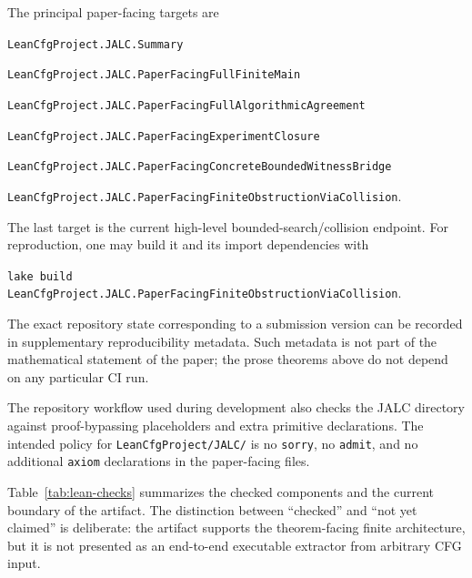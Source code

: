 \documentclass[sub]{jalc}
\begin{document}
The principal paper-facing
targets are
\begin{center}\small
\begin{minipage}{0.92\linewidth}
\texttt{LeanCfgProject.JALC.Summary}\par
\texttt{LeanCfgProject.JALC.PaperFacingFullFiniteMain}\par
\texttt{LeanCfgProject.JALC.PaperFacingFullAlgorithmicAgreement}\par
\texttt{LeanCfgProject.JALC.PaperFacingExperimentClosure}\par
\texttt{LeanCfgProject.JALC.PaperFacingConcreteBoundedWitnessBridge}\par
\texttt{LeanCfgProject.JALC.PaperFacingFiniteObstructionViaCollision}.
\end{minipage}
\end{center}
The last target is the current high-level bounded-search/collision endpoint.
For reproduction, one may build it and its import dependencies with
\begin{center}\small
\texttt{lake build LeanCfgProject.JALC.PaperFacingFiniteObstructionViaCollision}.
\end{center}
The exact repository state corresponding to a submission version can be recorded
in supplementary reproducibility metadata.  Such metadata is not part of the
mathematical statement of the paper; the prose theorems above do not depend on
any particular CI run.

The repository workflow used during development also checks the JALC directory
against proof-bypassing placeholders and extra primitive declarations.  The
intended policy for \texttt{LeanCfgProject/JALC/} is no \texttt{sorry}, no
\texttt{admit}, and no additional \texttt{axiom} declarations in the
paper-facing files.

Table~\ref{tab:lean-checks} summarizes the checked components and the current
boundary of the artifact.  The distinction between ``checked'' and ``not yet
claimed'' is deliberate: the artifact supports the theorem-facing finite
architecture, but it is not presented as an end-to-end executable extractor from
arbitrary CFG input.
\end{document}
